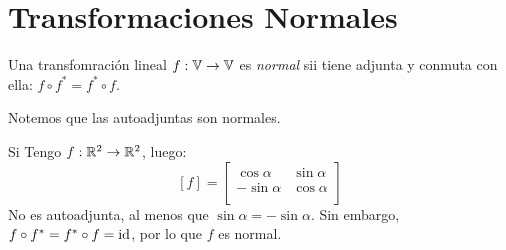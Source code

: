 \documentclass{article}
\begin{document}
\section*{Transformaciones Normales}
\begin{defi}
    Una transfomración lineal $f : \mathbb{V} \to \mathbb{V}$ es \emph{normal} sii tiene adjunta y conmuta con ella: $f \circ f^* = f^* \circ f$.

    Notemos que las autoadjuntas son normales.
\end{defi}
\begin{ej}
    Si Tengo $f : \mathbb{R}^2 \to \mathbb{R}^2$, luego:
    \[
        [f] =
        \begin{bmatrix}
            \cos \alpha & \sin \alpha \\
            -\sin \alpha & \cos \alpha \\
        \end{bmatrix}
    \]
    No es autoadjunta, al menos que $\sin \alpha = -\sin \alpha$. Sin embargo, $f \circ f^* = f^* \circ f = \operatorname{id}$, por lo que $f$ es normal.
\end{ej}
\end{document}
